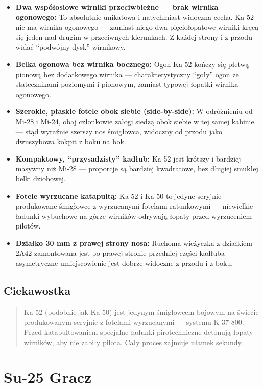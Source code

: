\documentclass[12pt,openany,oneside]{book}
\providecommand{\tightlist}{%
  \setlength{\itemsep}{0pt}\setlength{\parskip}{0pt}}
\begin{document}
\begin{itemize}
\tightlist
\item
  \textbf{Dwa współosiowe wirniki przeciwbieżne --- brak wirnika
  ogonowego:} To absolutnie unikatowa i natychmiast widoczna cecha.
  Ka-52 nie ma wirnika ogonowego --- zamiast niego dwa pięciołopatowe
  wirniki kręcą się jeden nad drugim w przeciwnych kierunkach. Z każdej
  strony i z przodu widać ``podwójny dysk'' wirnikowy.
\item
  \textbf{Belka ogonowa bez wirnika bocznego:} Ogon Ka-52 kończy się
  płetwą pionową bez dodatkowego wirnika --- charakterystyczny ``goły''
  ogon ze statecznikami poziomymi i pionowym, zamiast typowej łopatki
  wirnika ogonowego.
\item
  \textbf{Szerokie, płaskie fotele obok siebie (side-by-side):} W
  odróżnieniu od Mi-28 i Mi-24, obaj członkowie załogi siedzą obok
  siebie w tej samej kabinie --- stąd wyraźnie szerszy nos śmigłowca,
  widoczny od przodu jako dwuszybowa kokpit z boku na bok.
\item
  \textbf{Kompaktowy, ``przysadzisty'' kadłub:} Ka-52 jest krótszy i
  bardziej masywny niż Mi-28 --- proporcje są bardziej kwadratowe, bez
  długiej smukłej belki dziobowej.
\item
  \textbf{Fotele wyrzucane katapultą:} Ka-52 i Ka-50 to jedyne seryjnie
  produkowane śmigłowce z wyrzucanymi fotelami ratunkowymi ---
  niewielkie ładunki wybuchowe na górze wirników odrywają łopaty przed
  wyrzuceniem pilotów.
\item
  \textbf{Działko 30 mm z prawej strony nosa:} Ruchoma wieżyczka z
  działkiem 2A42 zamontowana jest po prawej stronie przedniej części
  kadłuba --- asymetryczne umiejscowienie jest dobrze widoczne z przodu
  i z boku.
\end{itemize}

\section{Ciekawostka}\label{ciekawostka-41}

\begin{quote}
Ka-52 (podobnie jak Ka-50) jest jedynym śmigłowcem bojowym na świecie
produkowanym seryjnie z fotelami wyrzucanymi --- systemu K-37-800. Przed
katapultowaniem specjalne ładunki pirotechniczne detonują łopaty
wirników, aby nie zabiły pilota. Cały proces zajmuje ułamek sekundy.
\end{quote}

\chapter{Su-25 Gracz}\label{su-25-gracz}
\end{document}
